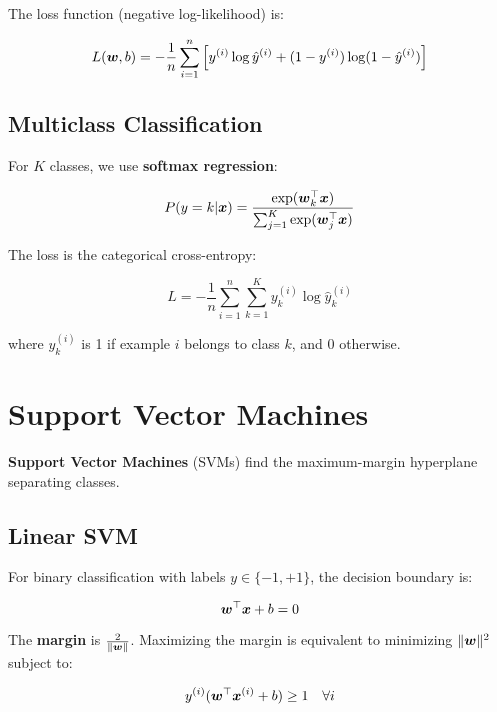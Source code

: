 The loss function (negative log-likelihood) is:

\begin{equation}
L(\boldsymbol{w}, b) = -\frac{1}{n} \sum_{i=1}^{n} \left[y^{(i)} \log \hat{y}^{(i)} + (1-y^{(i)}) \log(1-\hat{y}^{(i)})\right]
\end{equation}

\subsection{Multiclass Classification}

For $K$ classes, we use \textbf{softmax regression}:

\begin{equation}
P(y=k|\boldsymbol{x}) = \frac{\exp(\boldsymbol{w}_k^\top \boldsymbol{x})}{\sum_{j=1}^{K} \exp(\boldsymbol{w}_j^\top \boldsymbol{x})}
\end{equation}

The loss is the categorical cross-entropy:

\begin{equation}
L = -\frac{1}{n} \sum_{i=1}^{n} \sum_{k=1}^{K} y_k^{(i)} \log \hat{y}_k^{(i)}
\end{equation}

where $y_k^{(i)}$ is 1 if example $i$ belongs to class $k$, and 0 otherwise.

\section{Support Vector Machines}
\label{sec:svm}

\textbf{Support Vector Machines} (SVMs) find the maximum-margin hyperplane separating classes.

\subsection{Linear SVM}

For binary classification with labels $y \in \{-1, +1\}$, the decision boundary is:

\begin{equation}
\boldsymbol{w}^\top \boldsymbol{x} + b = 0
\end{equation}

The \textbf{margin} is $\frac{2}{\|\boldsymbol{w}\|}$. Maximizing the margin is equivalent to minimizing $\|\boldsymbol{w}\|^2$ subject to:

\begin{equation}
y^{(i)}(\boldsymbol{w}^\top \boldsymbol{x}^{(i)} + b) \geq 1 \quad \forall i
\end{equation}

